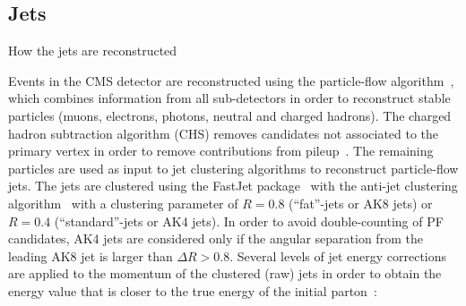 \clearpage


\subsection{Jets}\label{ssec:jets}
{\color{red} How the jets are reconstructed}

Events in the CMS detector are reconstructed using the particle-flow algorithm~\cite{bib:PF1,bib:PF2}, which combines information from all sub-detectors in order to reconstruct stable particles (muons, electrons, photons, neutral and charged hadrons). The charged hadron subtraction algorithm (CHS) removes candidates not associated to the primary vertex in order to remove contributions from pileup~\cite{CMS-PAS-JME-14-001}. The remaining particles are used as input to jet clustering algorithms to reconstruct particle-flow jets. The jets are clustered using the {\sc FastJet} package~\cite{bib:fastjet} with the anti-\kt jet clustering algorithm~\cite{Cacciari:2008gp} with a clustering parameter of $R = 0.8$ (``fat''-jets or AK8 jets) or $R = 0.4$ (``standard''-jets or AK4 jets). In order to avoid double-counting of PF candidates, AK4 jets are considered only if the angular separation from the leading AK8 jet is larger than $\Delta R>0.8$.
Several levels of jet energy corrections are applied to the momentum of the clustered (raw) jets in order to obtain the energy value that is closer to the true energy of the initial parton~\cite{bib:1748-0221-6-11-P11002}:

